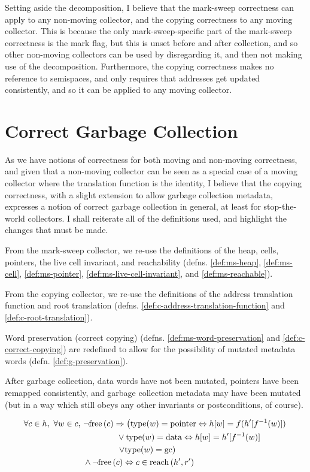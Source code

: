 Setting aside the decomposition, I believe that the mark-sweep
correctness can apply to any non-moving collector, and the copying
correctness to any moving collector. This is because the only
mark-sweep-specific part of the mark-sweep correctness is the mark
flag, but this is unset before and after collection, and so other
non-moving collectors can be used by disregarding it, and then not
making use of the decomposition. Furthermore, the copying correctness
makes no reference to semispaces, and only requires that addresses get
updated consistently, and so it can be applied to any moving
collector.

\section{Correct Garbage Collection}
\label{sec:gc-correct}

As we have notions of correctness for both moving and non-moving
correctness, and given that a non-moving collector can be seen as a
special case of a moving collector where the translation function is
the identity, I believe that the copying correctness, with a slight
extension to allow garbage collection metadata, expresses a notion of
correct garbage collection in general, at least for stop-the-world
collectors. I shall reiterate all of the definitions used, and
highlight the changes that must be made.

From the mark-sweep collector, we re-use the definitions of the heap,
cells, pointers, the live cell invariant, and reachability
(defns. \ref{def:ms-heap}, \ref{def:ms-cell}, \ref{def:ms-pointer},
\ref{def:ms-live-cell-invariant}, and \ref{def:ms-reachable}).

From the copying collector, we re-use the definitions of the address
translation function and root translation
(defns. \ref{def:c-address-translation-function} and
\ref{def:c-root-translation}).

Word preservation (correct copying)
(defns. \ref{def:ms-word-preservation} and
\ref{def:c-correct-copying}) are redefined to allow for the
possibility of mutated metadata words
(defn. \ref{def:g-preservation}).

\begin{definition}[Preservation]
  \label{def:g-preservation}
  After garbage collection, data words have not been mutated, pointers
  have been remapped consistently, and garbage collection metadata may
  have been mutated (but in a way which still obeys any other
  invariants or postconditions, of course).

  \begin{align*}
    \forall c \in h,\ \forall w \in c,\ &\lnot\mathrm{free}\left(c\right) \Rightarrow
    \left(\mathrm{type}(w) = \mathrm{pointer} \Leftrightarrow h[w] = f(h'[f^{-1}(w)])\right.\\
    &\quad\quad\quad\quad \lor \mathrm{type}(w) = \mathrm{data}
    \Leftrightarrow h[w] = h'[f^{-1}(w)]\\
    &\quad\quad\quad\quad \left.\lor \mathrm{type}(w) = \mathrm{gc}\right)\\
    &\land \lnot\mathrm{free}\left(c\right) \Leftrightarrow c \in \mathrm{reach}\left(h', r'\right)
  \end{align*}
\end{definition}

